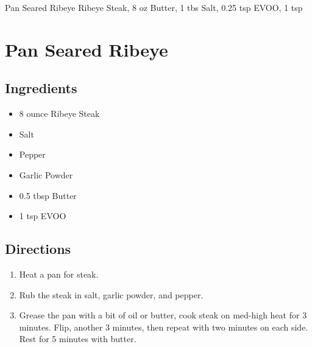 Pan Seared Ribeye
  Ribeye Steak, 8 oz
  Butter, 1 tbs
  Salt, 0.25 tsp
  EVOO, 1 tsp

\section{ Pan Seared Ribeye }

\subsection{ Ingredients }

\begin{itemize}
  \item 8 ounce Ribeye Steak
  \item Salt
  \item Pepper
  \item Garlic Powder
  \item 0.5 tbsp Butter
  \item 1 tsp EVOO
\end{itemize}

\subsection{ Directions }

\begin{enumerate}
  \item Heat a pan for steak. 
  \item Rub the steak in salt, garlic powder, and pepper. 
  \item Grease the pan with a bit of oil or butter, cook steak on med-high heat for 3 minutes. Flip, another 3 minutes, then repeat with two minutes on each side. Rest for 5 minutes with butter.
\end{enumerate}

